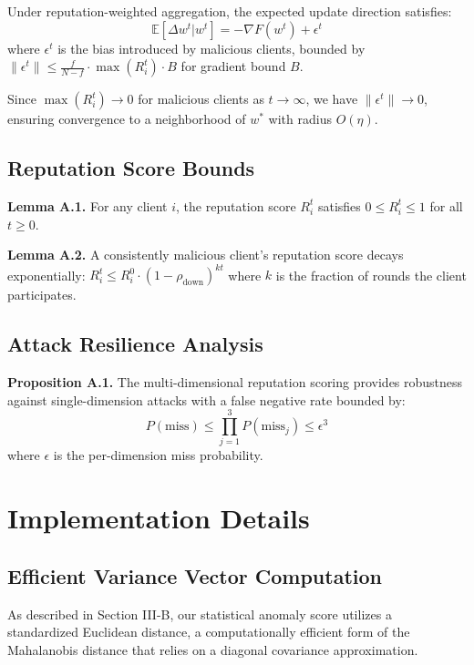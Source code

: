 \documentclass[lettersize,journal]{IEEEtran}
\begin{document}
Under reputation-weighted aggregation, the expected update direction satisfies:
\begin{equation}
\mathbb{E}[\Delta w^t | w^t] = -\nabla F(w^t) + \epsilon^t
\end{equation}
where $\epsilon^t$ is the bias introduced by malicious clients, bounded by $\|\epsilon^t\| \leq \frac{f}{N-f} \cdot \max(R_i^t) \cdot B$ for gradient bound $B$.

Since $\max(R_i^t) \to 0$ for malicious clients as $t \to \infty$, we have $\|\epsilon^t\| \to 0$, ensuring convergence to a neighborhood of $w^*$ with radius $O(\eta)$.

\subsection{Reputation Score Bounds}

\textbf{Lemma A.1.} For any client $i$, the reputation score $R_i^t$ satisfies $0 \leq R_i^t \leq 1$ for all $t \geq 0$.

\textbf{Lemma A.2.} A consistently malicious client's reputation score decays exponentially: $R_i^t \leq R_i^0 \cdot (1-\rho_{\text{down}})^{kt}$ where $k$ is the fraction of rounds the client participates.

\subsection{ Attack Resilience Analysis}

\textbf{Proposition A.1.} The multi-dimensional reputation scoring provides robustness against single-dimension attacks with a false negative rate bounded by:
\begin{equation}
P(\text{miss}) \leq \prod_{j=1}^{3} P(\text{miss}_j) \leq \epsilon^3
\end{equation}
where $\epsilon$ is the per-dimension miss probability.

\section{Implementation Details}

\subsection{Efficient Variance Vector Computation} \label{app:VarianceComputation}

As described in Section III-B, our statistical anomaly score utilizes a standardized Euclidean distance, a computationally efficient form of the Mahalanobis distance that relies on a diagonal covariance approximation.
\end{document}
